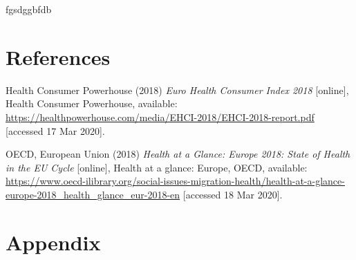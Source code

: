 \documentclass[
  12pt,
]{article}
\newlength{\cslhangindent}
\newenvironment{cslreferences}%
  {\setlength{\parindent}{0pt}%
  \everypar{\setlength{\hangindent}{\cslhangindent}}\ignorespaces}%
  {\par}
\begin{document}
fgsdggbfdb

\hypertarget{references}{%
\section{References}\label{references}}

\hypertarget{refs}{}
\begin{cslreferences}
\leavevmode\hypertarget{ref-health_consumer_powerhouse_euro_2018}{}%
Health Consumer Powerhouse (2018) \emph{Euro Health Consumer Index 2018} {[}online{]}, Health Consumer Powerhouse, available: \url{https://healthpowerhouse.com/media/EHCI-2018/EHCI-2018-report.pdf} {[}accessed 17 Mar 2020{]}.

\leavevmode\hypertarget{ref-oecd_health_2018}{}%
OECD, European Union (2018) \emph{Health at a Glance: Europe 2018: State of Health in the EU Cycle} {[}online{]}, Health at a glance: Europe, OECD, available: \url{https://www.oecd-ilibrary.org/social-issues-migration-health/health-at-a-glance-europe-2018_health_glance_eur-2018-en} {[}accessed 18 Mar 2020{]}.
\end{cslreferences}

\newpage

\hypertarget{appendix}{%
\section{Appendix}\label{appendix}}

\label{sec:appendix}
\appendix
\end{document}
